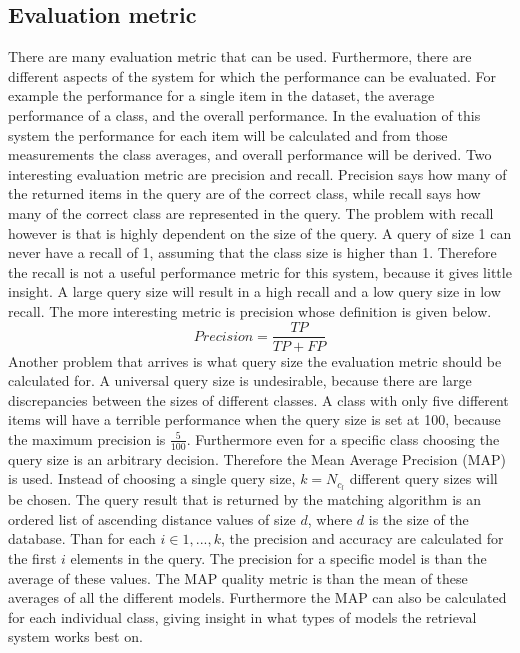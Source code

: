\documentclass{bigdata}
\begin{document}
\subsection{Evaluation metric}
There are many evaluation metric that can be used. Furthermore, there are different aspects of the system for which the performance can be evaluated. For example the performance for a single item in the dataset, the average performance of a class, and the overall performance. In the evaluation of this system the performance for each item will be calculated and from those measurements the class averages, and overall performance will be derived. 
Two interesting evaluation metric are precision and recall. Precision says how many of the returned items in the query are of the correct class, while recall says how many of the correct class are represented in the query. The problem with recall however is that is highly dependent on the size of the query. A query of size 1 can never have a recall of 1, assuming that the class size is higher than 1. Therefore the recall is not a useful performance metric for this system, because it gives little insight. A large query size will result in a high recall and a low query size in low recall. The more interesting metric is precision whose definition is given below.
\begin{equation}
Precision = \frac{TP}{TP+FP}
\end{equation}
Another problem that arrives is what query size the evaluation metric should be calculated for. A universal query size is undesirable, because there are large discrepancies between the sizes of different classes. A class with only five different items will have a terrible performance when the query size is set at 100, because the maximum precision is $\frac{5}{100}$. 
Furthermore even for a specific class choosing the query size is an arbitrary decision. Therefore the Mean Average Precision (MAP) is used. Instead of choosing a single query size, $k = N_{c_l}$ different query sizes will be chosen. The query result that is returned by the matching algorithm is an ordered list of ascending distance values of size $d$, where $d$ is the size of the database. Than for each $i \in {1,...,k}$, the precision and accuracy are calculated for the first $i$ elements in the query. The precision for a specific model is than the average of these values. The MAP quality metric is than the mean of these averages of all the different models. Furthermore the MAP can also be calculated for each individual class, giving insight in what types of models the retrieval system works best on. 
\end{document}
